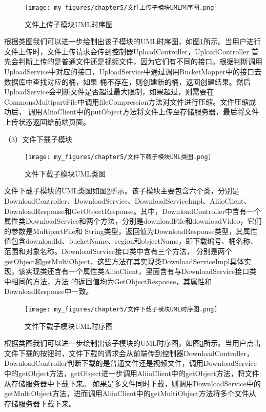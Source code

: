 \begin{figure}[htb]
    \centering
    \texttt{[image: my\_figures/chapter5/文件上传子模块UML时序图.png]}
    \caption{文件上传子模块UML时序图}
    \label{fig:文件上传子模块UML时序图}
\end{figure}


根据类图我们可以进一步绘制出该子模块的UML时序图，如图\ref{fig:文件上传子模块UML时序图}所示。当用户进行文件上传时，文件上传请求会传到控制器UploadController，UploadController
首先会判断上传的是普通文件还是视频文件，因为它们有不同的接口。根据判断调用UploadService中对应的接口，UploadService中通过调用BucketMapper中的接口去数据库中查找对应的桶，如果
桶不存在，则创建新的桶，返回创建结果。然后UploadService会判断文件是否超过最大限制，如果超过，则需要在CommonsMultipartFile中调用fileCompression方法对文件进行压缩。文件压缩成功后，
调用AliioClient中的putObject方法将文件上传至存储服务器，最后将文件上传状态返回给前端页面。


（3）文件下载子模块

\begin{figure}[htb]
    \centering
    \texttt{[image: my\_figures/chapter5/文件下载子模块UML类图.png]}
    \caption{文件下载子模块UML类图}
    \label{fig:文件下载子模块UML类图}
\end{figure}


文件下载子模块的UML类图如图\ref{fig:文件下载子模块UML类图}所示。该子模块主要包含六个类，分别是DownloadController、DownloadService、DownloadServiceImpl、AliioClient、
DownloadResponse和GetObjectResponse。其中，DownloadController中含有一个属性类DownloadService和两个方法，分别是downloadFile和downloadVideo，它们的参数是MultipartFile和
String类型，返回值为DownloadResponse类型，其属性值包含downloadId、bucketName、region和objectName，即下载编号、桶名称、范围和对象名称。DownloadService接口类中含有三个方法，
分别是两个getObject和getMultiObject，这些方法在其实现类DownloadServiceImpl具体实现，该实现类还含有一个属性类AliioClient，里面含有与DownloadService接口类中相同的方法，方法
的返回值均为GetObjectResponse，其属性和DownloadResponse中一致。


\begin{figure}[htb]
    \centering
    \texttt{[image: my\_figures/chapter5/文件下载子模块UML时序图.png]}
    \caption{文件下载子模块UML时序图}
    \label{fig:文件下载子模块UML时序图}
\end{figure}

根据类图我们可以进一步绘制出该子模块的UML时序图，如图\ref{fig:文件下载子模块UML时序图}所示。当用户点击文件下载的按钮时，文件下载的请求会从前端传到控制器DownloadController，
DownloadController判断下载的是普通文件还是视频文件，调用DownloadService中的getObject方法，getObject进一步调用AliioClient中的getObject方法，将文件从存储服务器中下载下来。
如果是多文件同时下载，则调用DownloadService中的getMultiObject方法，进而调用AliioClient中的getMultiObject方法将多个文件从存储服务器下载下来。





